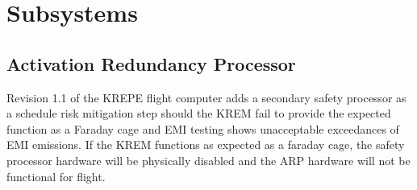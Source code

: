 \documentclass{article}
\begin{document}





\section{Subsystems}
\label{sec:subsystems}

\iffalse
\subsection{Activation Redundancy Processor}
\label{actred}
Revision 1.1 of the KREPE flight computer adds a secondary safety processor as a schedule risk mitigation step should the KREM fail to provide the expected function as a Faraday cage and EMI testing shows unacceptable exceedances of EMI emissions. If the KREM functions as expected as a faraday cage, the safety processor hardware will be physically disabled and the ARP hardware will not be functional for flight. 
\end{document}
